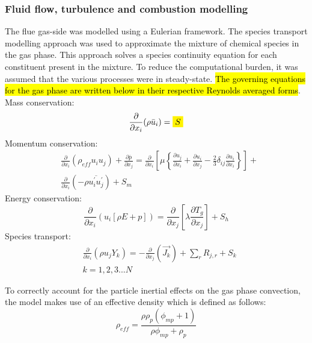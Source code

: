 \documentclass[twocolumn,10pt]{asme2ej}
\newcommand{\highlight}[1]{%
  \colorbox{yellow!}{$\displaystyle#1$}}
\begin{document}
\subsubsection{Fluid flow, turbulence and combustion modelling}
The flue gas-side was modelled using a Eulerian framework. The species transport modelling approach was used to approximate the mixture of chemical species in the gas phase. This approach solves a species continuity equation for each constituent present in the mixture. To reduce the computational burden, it was assumed that the various processes were in steady-state. \hl{The governing equations for the gas phase are written below in their respective Reynolds averaged forms}.\\
Mass conservation:
\begin{equation}\label{eqn_RANS_mass}
\frac{\partial}{\partial x_{i}}(\rho \bar{u}_{i})=\highlight{S}
\end{equation}
Momentum conservation:
\begin{equation}\label{eqn_momentum}
\begin{split}
&\frac{\partial}{\partial x_{i}}(\rho_{eff} u_{i}u_{j})+\frac{\partial \overline{p}}{\partial x_{j}}=\frac{\partial}{\partial x_{i}}\left[\mu\left\{\frac{\partial u_{j}}{\partial x_{i}}+\frac{\partial u_{i}}{\partial x_{j}}-\frac{2}{3}\delta_{ij}\frac{\partial u_{i}}{\partial x_{i}}\right\}\right]+\\
&\frac{\partial}{\partial x_{i}}(-\rho\overline{u_{i}^{'}u_{j}^{'}})+S_m
\end{split}
\end{equation}
Energy conservation:
\begin{equation}\label{eqn_energy}
\frac{\partial }{\partial x_{i}} (u_{i}[\rho E+p])=\frac{\partial }{\partial x_{j}}\left[\lambda\frac{\partial T_{g}}{\partial x_{j}}\right] +S_{h}
\end{equation}
Species transport:
\begin{equation}\label{eqn_species}
\begin{split}
&\frac{\partial}{\partial x_{i}}(\rho u_{j}Y_{k})=-\frac{\partial}{\partial x_{j}}(\vec{J_{k}})+ \sum_r R_{j,r} + S_{k}\\
&k = 1,2,3...N
\end{split}
\end{equation}

To correctly account for the particle inertial effects on the gas phase convection, the model makes use of an effective density which is defined as follows:
\begin{equation} \label{eqn_eff_rho}
	\rho_{eff} = \frac{\rho \rho_p \left( \phi_{mp} + 1 \right)}{\rho \phi_{mp} + \rho_p}
\end{equation}
\end{document}
